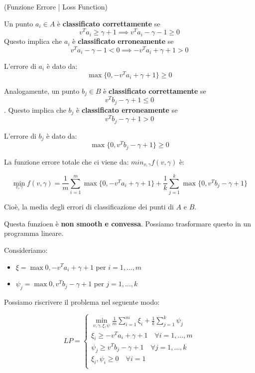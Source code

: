 \begin{definition}
    (Funzione Errore | Loss Function)

    Un punto $a_i \in A$ è \textbf{classificato correttamente} se $$ v^T a_i \geq
        \gamma + 1 \implies v^T a_i - \gamma - 1 \geq 0 $$ Questo implica che $a_i$ è
    \textbf{classificato erroneamente} se $$ v^T a_i - \gamma -1 < 0 \implies -v^T
        a_i + \gamma + 1 > 0 $$

    L'errore di $a_i$ è dato da: $$ \max\{0, -v^T a_i + \gamma + 1\} \geq 0 $$

    Analogamente, un punto $b_j \in B$ è \textbf{classificato correttamente} se $$
        v^T b_j - \gamma + 1 \leq 0 $$. Questo implica che $b_j$ è \textbf{classificato
        erroneamente} se $$ v^T b_j - \gamma + 1 > 0 $$

    L'errore di $b_j$ è dato da: $$ \max\{0, v^T b_j - \gamma + 1\} \geq 0 $$

    La funzione errore totale che ci viene da: $min_{v,\gamma} f(v,\gamma)$ è:

    $$
    \min_{v,\gamma} f(v,\gamma) = \frac{1}{m} \sum_{i=1}^{m} \max\{0, -v^T a_i + \gamma + 1\} + \frac{1}{k} \sum_{j=1}^{k} \max\{0, v^T b_j - \gamma + 1\}
    $$

    Cioè, la media degli errori di classificazione dei punti di $A$ e $B$.

    Questa funzioen è \textbf{non smooth e convessa}. Possiamo trasformare questo in un programma lineare.

    Consideriamo:
    \begin{itemize}
        \item $\xi  = \max{0, -v^T a_i + \gamma + 1}$ per $i = 1, \dots, m$
        \item $\psi_j = \max{0, v^T b_j - \gamma + 1}$ per $j = 1, \dots, k$
    \end{itemize}

    Possiamo riscrivere il problema nel seguente modo:

    $$
    LP = \begin{cases}
        \min_{v,\gamma, \xi, \psi} \frac{1}{m} \sum_{i=1}^{m} \xi_i + \frac{1}{k} \sum_{j=1}^{k} \psi_j \\

        \xi_i \geq -v^T a_i + \gamma + 1 \quad \forall i = 1, \dots, m \\
        \psi_j \geq v^T b_j - \gamma + 1 \quad \forall j = 1, \dots, k \\
        \xi_i, \psi_i \geq 0 \quad \forall i = 1\\
    \end{cases}
    $$
\end{definition}

